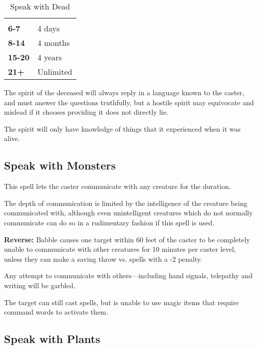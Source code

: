 \begin{multicols*}{2}
\begin {table}[H]
  \caption{Speak with Dead}\label{tab:Speak with Dead}
  \begin{tabularx}{\columnwidth}{>{\bfseries}YY}
	 & \\
	6-7 & 4 days\\
	8-14 & 4 months\\
	15-20 & 4 years\\
	21+ & Unlimited
  \end {tabularx}
\end {table}

The spirit of the deceased will always reply in a language known to the caster, and must answer the questions truthfully, but a hostile spirit may equivocate and mislead if it chooses providing it does not directly lie.

The spirit will only have knowledge of things that it experienced when it was alive.

\subsection{Speak with Monsters}\label{spell:Speak with Monsters}

This spell lets the caster communicate with any creature for the duration.

The depth of communication is limited by the intelligence of the creature being communicated with, although even unintelligent creatures which do not normally communicate can do so in a rudimentary fashion if this spell is used.

\textbf{Reverse:} Babble causes one target within 60 feet of the caster to be completely unable to communicate with other creatures for 10 minutes per caster level, unless they can make a saving throw vs. spells with a -2 penalty.

Any attempt to communicate with others—including hand signals, telepathy and writing will be garbled.

The target can still cast spells, but is unable to use magic items that require command words to activate them.

\subsection{Speak with Plants}\label{spell:Speak with Plants}
\end{multicols*}
